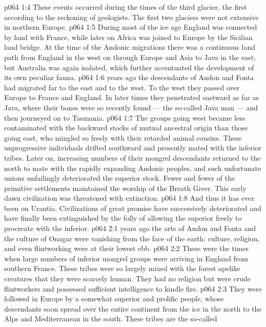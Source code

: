 \vs p064 1:4 \pc These events occurred during the times of the third glacier, the first according to the reckoning of geologists. The first two glaciers were not extensive in northern Europe.
\vs p064 1:5 During most of the ice age England was connected by land with France, while later on Africa was joined to Europe by the Sicilian land bridge. At the time of the Andonic migrations there was a continuous land path from England in the west on through Europe and Asia to Java in the east; but Australia was again isolated, which further accentuated the development of its own peculiar fauna.
\vs p064 1:6 \pc {} years ago the descendants of Andon and Fonta had migrated far to the east and to the west. To the west they passed over Europe to France and England. In later times they penetrated eastward as far as Java, where their bones were so recently found --- the so\hyp{}called Java man --- and then journeyed on to Tasmania.
\vs p064 1:7 The groups going west became less contaminated with the backward stocks of mutual ancestral origin than those going east, who mingled so freely with their retarded animal cousins. These unprogressive individuals drifted southward and presently mated with the inferior tribes. Later on, increasing numbers of their mongrel descendants returned to the north to mate with the rapidly expanding Andonic peoples, and such unfortunate unions unfailingly deteriorated the superior stock. Fewer and fewer of the primitive settlements maintained the worship of the Breath Giver. This early dawn civilization was threatened with extinction.
\vs p064 1:8 And thus it has ever been on Urantia. Civilizations of great promise have successively deteriorated and have finally been extinguished by the folly of allowing the superior freely to procreate with the inferior.
\vs p064 2:1  years ago the arts of Andon and Fonta and the culture of Onagar were vanishing from the face of the earth; culture, religion, and even flintworking were at their lowest ebb.
\vs p064 2:2 These were the times when large numbers of inferior mongrel groups were arriving in England from southern France. These tribes were so largely mixed with the forest apelike creatures that they were scarcely human. They had no religion but were crude flintworkers and possessed sufficient intelligence to kindle fire.
\vs p064 2:3 They were followed in Europe by a somewhat superior and prolific people, whose descendants soon spread over the entire continent from the ice in the north to the Alps and Mediterranean in the south. These tribes are the so\hyp{}called 
